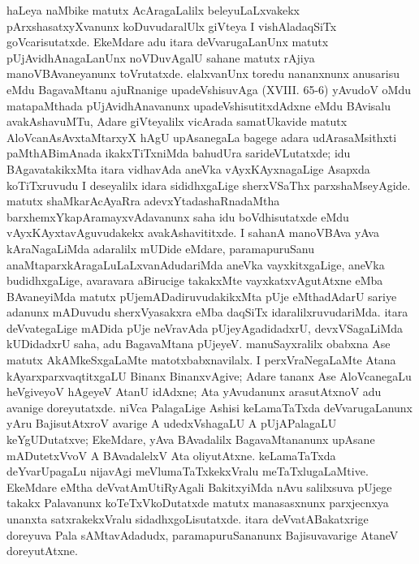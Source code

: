 haLeya naMbike matutx AcAragaLalilx beleyuLaLxvakekx pArxshasatxyXvanunx koDuvudaralUlx giVteya I vishAladaqSiTx goVcarisutatxde. EkeMdare adu itara deVvarugaLanUnx matutx pUjAvidhAnagaLanUnx noVDuvAgalU sahane matutx rAjiya manoVBAvaneyanunx toVrutatxde. elalxvanUnx toredu nananxnunx anusarisu eMdu BagavaMtanu ajuRnanige upadeVshisuvAga {\rm(XVIII. 65-6)} yAvudoV oMdu matapaMthada pUjAvidhAnavanunx upadeVshisutitxdAdxne eMdu BAvisalu avakAshavuMTu, Adare giVteyalilx vicArada samatUkavide matutx AloVcanAsAvxtaMtarxyX hAgU upAsanegaLa bagege adara udArasaMsithxti paMthABimAnada ikakxTiTxniMda bahudUra sarideVLutatxde; idu BAgavatakikxMta itara vidhavAda aneVka vAyxKAyxnagaLige Asapxda koTiTxruvudu I deseyalilx idara sididhxgaLige sherxVSaThx parxshaMseyAgide. matutx shaMkarAcAyaRra adevxYtadashaRnadaMtha barxhemxYkapAramayxvAdavanunx saha idu boVdhisutatxde eMdu vAyxKAyxtavAguvudakekx avakAshavititxde. I sahanA manoVBAva yAva kAraNagaLiMda adaralilx mUDide eMdare, paramapuruSanu anaMtaparxkAragaLuLaLxvanAdudariMda aneVka vayxkitxgaLige, aneVka budidhxgaLige, avaravara aBirucige takakxMte vayxkatxvAgutAtxne eMba BAvaneyiMda matutx pUjemADadiruvudakikxMta pUje eMthadAdarU sariye adanunx mADuvudu sherxVyasakxra eMba daqSiTx idaralilxruvudariMda. itara deVvategaLige mADida pUje neVravAda pUjeyAgadidadxrU, devxVSagaLiMda kUDidadxrU saha, adu BagavaMtana pUjeyeV. manuSayxralilx obabxna Ase matutx AkAMkeSxgaLaMte matotxbabxnavilalx. I perxVraNegaLaMte Atana kAyarxparxvaqtitxgaLU Binanx BinanxvAgive; Adare tananx Ase AloVcanegaLu heVgiveyoV hAgeyeV AtanU idAdxne; Ata yAvudanunx arasutAtxnoV adu avanige doreyutatxde. niVca PalagaLige Ashisi keLamaTaTxda deVvarugaLanunx yAru BajisutAtxroV avarige A udedxVshagaLU A pUjAPalagaLU keYgUDutatxve; EkeMdare, yAva BAvadalilx BagavaMtananunx upAsane mADutetxVvoV A BAvadalelxV Ata oliyutAtxne. keLamaTaTxda deYvarUpagaLu nijavAgi meVlumaTaTxkekxVralu meTaTxlugaLaMtive. EkeMdare eMtha deVvatAmUtiRyAgali BakitxyiMda nAvu salilxsuva pUjege takakx Palavanunx koTeTxVkoDutatxde matutx manasasxnunx parxjecnxya unanxta satxrakekxVralu sidadhxgoLisutatxde. itara deVvatABakatxrige doreyuva Pala sAMtavAdadudx, paramapuruSananunx Bajisuvavarige AtaneV doreyutAtxne.

